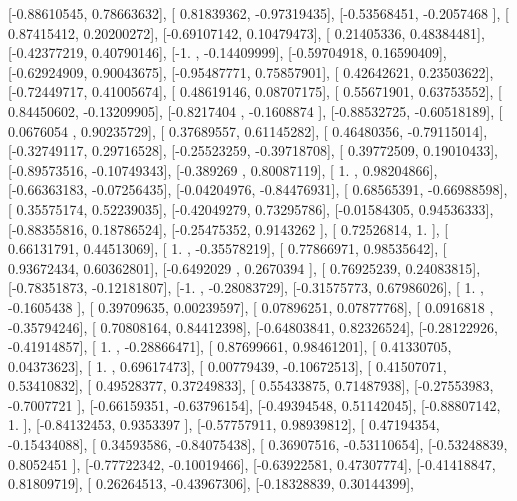 \documentclass{article}
\begin{document}
       [-0.88610545,  0.78663632],
       [ 0.81839362, -0.97319435],
       [-0.53568451, -0.2057468 ],
       [ 0.87415412,  0.20200272],
       [-0.69107142,  0.10479473],
       [ 0.21405336,  0.48384481],
       [-0.42377219,  0.40790146],
       [-1.        , -0.14409999],
       [-0.59704918,  0.16590409],
       [-0.62924909,  0.90043675],
       [-0.95487771,  0.75857901],
       [ 0.42642621,  0.23503622],
       [-0.72449717,  0.41005674],
       [ 0.48619146,  0.08707175],
       [ 0.55671901,  0.63753552],
       [ 0.84450602, -0.13209905],
       [-0.8217404 , -0.1608874 ],
       [-0.88532725, -0.60518189],
       [ 0.0676054 ,  0.90235729],
       [ 0.37689557,  0.61145282],
       [ 0.46480356, -0.79115014],
       [-0.32749117,  0.29716528],
       [-0.25523259, -0.39718708],
       [ 0.39772509,  0.19010433],
       [-0.89573516, -0.10749343],
       [-0.389269  ,  0.80087119],
       [ 1.        ,  0.98204866],
       [-0.66363183, -0.07256435],
       [-0.04204976, -0.84476931],
       [ 0.68565391, -0.66988598],
       [ 0.35575174,  0.52239035],
       [-0.42049279,  0.73295786],
       [-0.01584305,  0.94536333],
       [-0.88355816,  0.18786524],
       [-0.25475352,  0.9143262 ],
       [ 0.72526814,  1.        ],
       [ 0.66131791,  0.44513069],
       [ 1.        , -0.35578219],
       [ 0.77866971,  0.98535642],
       [ 0.93672434,  0.60362801],
       [-0.6492029 ,  0.2670394 ],
       [ 0.76925239,  0.24083815],
       [-0.78351873, -0.12181807],
       [-1.        , -0.28083729],
       [-0.31575773,  0.67986026],
       [ 1.        , -0.1605438 ],
       [ 0.39709635,  0.00239597],
       [ 0.07896251,  0.07877768],
       [ 0.0916818 , -0.35794246],
       [ 0.70808164,  0.84412398],
       [-0.64803841,  0.82326524],
       [-0.28122926, -0.41914857],
       [ 1.        , -0.28866471],
       [ 0.87699661,  0.98461201],
       [ 0.41330705,  0.04373623],
       [ 1.        ,  0.69617473],
       [ 0.00779439, -0.10672513],
       [ 0.41507071,  0.53410832],
       [ 0.49528377,  0.37249833],
       [ 0.55433875,  0.71487938],
       [-0.27553983, -0.7007721 ],
       [-0.66159351, -0.63796154],
       [-0.49394548,  0.51142045],
       [-0.88807142,  1.        ],
       [-0.84132453,  0.9353397 ],
       [-0.57757911,  0.98939812],
       [ 0.47194354, -0.15434088],
       [ 0.34593586, -0.84075438],
       [ 0.36907516, -0.53110654],
       [-0.53248839,  0.8052451 ],
       [-0.77722342, -0.10019466],
       [-0.63922581,  0.47307774],
       [-0.41418847,  0.81809719],
       [ 0.26264513, -0.43967306],
       [-0.18328839,  0.30144399],
\end{document}
